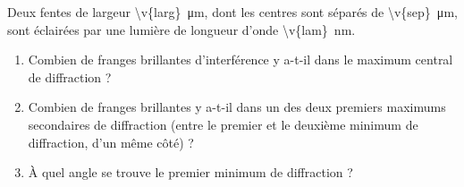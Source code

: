 Deux fentes de largeur \qty{\v{larg}}{\micro\metre}, dont les centres sont séparés de \qty{\v{sep}}{\micro\metre}, sont éclairées par une lumière de longueur d'onde \qty{\v{lam}}{nm}.

\begin{enumerate}[label=\alph*)]
    \item Combien de franges brillantes d'interférence y a-t-il dans le maximum central de diffraction ?
    \item Combien de franges brillantes y a-t-il dans un des deux premiers maximums secondaires de diffraction (entre le premier et le deuxième minimum de diffraction, d'un même côté) ?
    \item À quel angle se trouve le premier minimum de diffraction ?
\end{enumerate}
